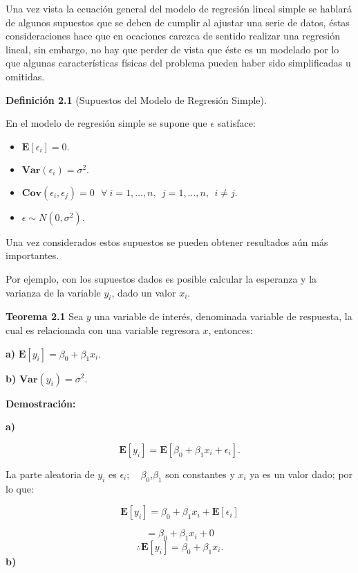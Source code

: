 \documentclass[
  a4paper,
  oneside,
  openany]{book}
\begin{document}
Una vez vista la ecuación general del modelo de regresión lineal simple se hablará de algunos supuestos que se deben de cumplir al ajustar una serie de datos, éstas consideraciones hace que en ocaciones carezca de sentido realizar una regresión lineal, sin embargo, no hay que perder de vista que éste es un modelado por lo que algunas características físicas del problema pueden haber sido simplificadas u omitidas.

\textbf{Definición 2.1} (Supuestos del Modelo de Regresión Simple).

En el modelo de regresión simple se supone que \(\epsilon\) satisface:

\begin{itemize}
\item
  \(\mathbf{E}[\epsilon_{i}]=0.\)
\item
  \(\textbf{Var}(\epsilon_{i})=\sigma^2.\)
\item
  \(\textbf{Cov}(\epsilon_{i},\epsilon_{j})= 0 \  \ \ \forall \ i = 1, \ldots, n, \ \  j=1, \ldots, n, \ \  i \neq j.\)
\item
  \(\epsilon \sim N(0,\sigma^2).\)
\end{itemize}

Una vez considerados estos supuestos se pueden obtener resultados aún más importantes.

Por ejemplo, con los supuestos dados es posible calcular la esperanza y la varianza de la variable \(y_{i}\), dado un valor \(x_{i}\).

\textbf{Teorema 2.1} Sea \(y\) una variable de interés, denominada variable de respuesta, la cual es relacionada con una variable regresora \(x\), entonces:

\textbf{a)} \(\mathbf{E}[y_{i}]=\beta_{0}+\beta_{1}x_{i}.\)

\textbf{b)} \(\textbf{Var}(y_{i})=\sigma^2.\)

\textbf{Demostración:}

\textbf{a)}

\[\mathbf{E}[y_{i}]=\mathbf{E}[\beta_{0}+\beta_{1}x_{i}+\epsilon_{i}].\]

La parte aleatoria de \(y_{i}\) es \(\epsilon_{i}\); ~ \(\beta_{0}\),\(\beta_{1}\) son constantes y \(x_{i}\) ya es un valor dado; por lo que:

\[\mathbf{E}[y_{i}]=\beta_{0}+\beta_{1}x_{i}+\mathbf{E}[\epsilon_{i}]\]

\[=\beta_{0}+\beta_{1}x_{i}+0\]
\[\therefore \mathbf{E}[y_{i}]=\beta_{0}+\beta_{1}x_{i}.\]
\textbf{b)}
\end{document}
